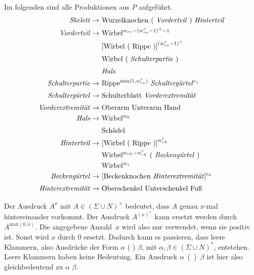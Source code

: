 Im folgenden sind alle Produktionen aus $P$ aufgeführt.
\begingroup
\allowdisplaybreaks
\begin{align*}
 \text{\emph{Skelett}} \rightarrow &\text{ Wurzelknochen ( \emph{Vorderteil} ) \emph{Hinterteil}}\\
 \text{\emph{Vorderteil}} \rightarrow &\text{ Wirbel}^{w_{rv} - (w_{rv}^r - 1)^+ - 1}\\
    &\text{ [Wirbel ( Rippe )]}^{(w_{rv}^r - 1)^+}\\
    &\text{ Wirbel ( \emph{Schulterpartie} )}^{\vphantom{(}}\\
    &\text{ \emph{Hals}}^{\vphantom{(}}\\
 \text{\emph{Schulterpartie}} \rightarrow &\text{ Rippe$^{\text{min}(1,w_{rv}^r)}$ \emph{Schultergürtel}$^{e_s}$}\\ 
 \text{\emph{Schultergürtel}} \rightarrow &\text{ Schulterblatt \emph{Vorderextremität}}^{\vphantom{(}}\\
 \text{\emph{Vorderextremität}} \rightarrow &\text{ Oberarm Unterarm Hand}^{\vphantom{(}}\\
 \text{\emph{Hals}} \rightarrow &\text{ Wirbel$^{w_h}$}\\
    &\text{ Schädel}^{\vphantom{(}}\\
 \text{\emph{Hinterteil}} \rightarrow &\text{ [Wirbel ( Rippe )]}^{w_{rh}^r}\\
    &\text{ Wirbel$^{w_{rh} - w_{rh}^r}$ ( \emph{Beckengürtel} )}\\
    &\text{ Wirbel$^{w_s}$}\\
 \text{\emph{Beckengürtel}} \rightarrow &\text{ [Beckenknochen \emph{Hinterextremität}]$^{e_b}$}\\
 \text{\emph{Hinterextremität}} \rightarrow &\text{ Oberschenkel Unterschenkel Fuß}^{\vphantom{(}}
\end{align*}
\endgroup

Der Ausdruck $A^x$ mit $A \in (\Sigma \cup N)^+$ bedeutet, dass $A$ genau $x$-mal hintereinander vorkommt. Der Ausdruck $A^{(x)^+}$ kann ersetzt werden durch $A^{\text{max}(0, x)}$. Die angegebene \mbox{Anzahl $x$} wird also nur verwendet, wenn sie positiv ist. Sonst wird $x$ durch $0$ ersetzt. Dadurch kann es passieren, dass leere Klammern, also Ausdrücke der Form $\alpha$ ( ) $\beta$, mit $\alpha, \beta \in (\Sigma \cup N)^*$, entstehen. Leere Klammern haben keine Bedeutung. Ein Ausdruck \mbox{$\alpha$ ( ) $\beta$} ist hier also gleichbedeutend zu $\alpha$ $\beta$.

